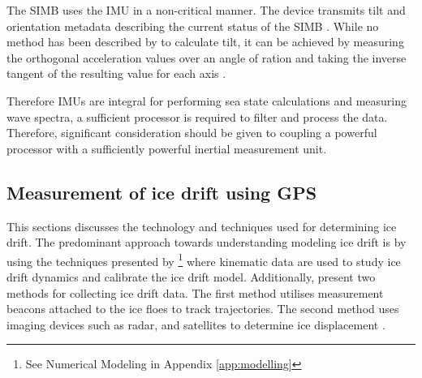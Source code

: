 The SIMB uses the IMU in a non-critical manner. The device transmits tilt and orientation metadata  describing the current status of the SIMB \cite{PLANCK2019102792}. While no method has been described by \textcite{PLANCK2019102792} to calculate tilt, it can be achieved by measuring the orthogonal acceleration values over an angle of ration and taking the inverse tangent of the resulting value for each axis \cite{tuck2007tilt}.


Therefore IMUs are integral for performing sea state calculations and measuring wave spectra, a sufficient processor is required to filter and process the data. Therefore, significant consideration should be given to coupling a powerful processor with a sufficiently powerful inertial measurement unit.

\subsection{Measurement of ice drift using GPS}
\label{sec:ch2_drift}

This sections discusses the technology and techniques used for determining ice drift. The predominant approach towards understanding modeling ice drift is by using the techniques presented by \textcite{hibler1979dynamic}\footnote{See Numerical Modeling in Appendix \ref{app:modelling}} where kinematic data are used to study ice drift dynamics and calibrate the ice drift model. Additionally, \textcite{lepparanta2001sea} present two methods for collecting ice drift data. The first method utilises measurement beacons attached to the ice floes to track trajectories. The second method uses imaging devices such as radar, and satellites to determine ice displacement \cite{lepparanta2001sea}.\par

